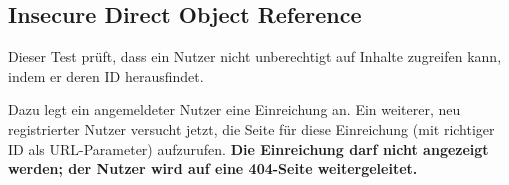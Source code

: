 \subsection{Insecure Direct Object Reference}\label{subsec:idor-test}
Dieser Test prüft, dass ein Nutzer nicht unberechtigt auf Inhalte zugreifen kann, indem er deren ID herausfindet.

Dazu legt ein angemeldeter Nutzer eine Einreichung an.
Ein weiterer, neu registrierter Nutzer versucht jetzt,
die Seite für diese Einreichung (mit richtiger ID als URL-Parameter) aufzurufen.
\textbf{Die Einreichung darf nicht angezeigt werden; der Nutzer wird auf eine 404-Seite weitergeleitet.}
